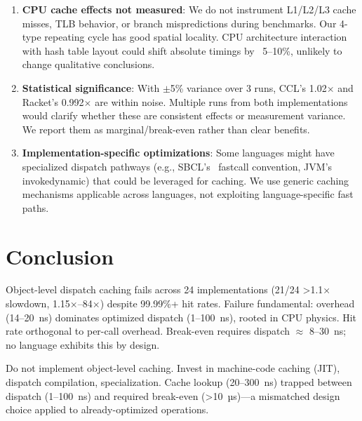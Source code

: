 \documentclass[sigplan,final,acmsmall,review,screen]{acmart}
\begin{document}
\begin{enumerate}
  \item \textbf{CPU cache effects not measured}: We do not instrument L1/L2/L3 cache misses, TLB behavior, or branch mispredictions during benchmarks. Our 4-type repeating cycle has good spatial locality. CPU architecture interaction with hash table layout could shift absolute timings by ~5--10\%, unlikely to change qualitative conclusions.

  \item \textbf{Statistical significance}: With $\pm$5\% variance over 3 runs, CCL's 1.02$\times$ and Racket's 0.992$\times$ are within noise. Multiple runs from both implementations would clarify whether these are consistent effects or measurement variance. We report them as marginal/break-even rather than clear benefits.

  \item \textbf{Implementation-specific optimizations}: Some languages might have specialized dispatch pathways (e.g., SBCL's ~fastcall convention, JVM's invokedynamic) that could be leveraged for caching. We use generic caching mechanisms applicable across languages, not exploiting language-specific fast paths.
\end{enumerate}

\section{Conclusion}

Object-level dispatch caching fails across 24 implementations (21/24 >1.1× slowdown, 1.15×--84×) despite 99.99\%+ hit rates. Failure fundamental: overhead (14--20~ns) dominates optimized dispatch (1--100~ns), rooted in CPU physics. Hit rate orthogonal to per-call overhead. Break-even requires dispatch $\approx$ 8--30~ns; no language exhibits this by design.

Do not implement object-level caching. Invest in machine-code caching (JIT), dispatch compilation, specialization. Cache lookup (20--300~ns) trapped between dispatch (1--100~ns) and required break-even (>10~µs)—a mismatched design choice applied to already-optimized operations.


\end{document}
